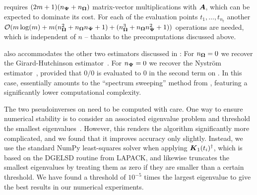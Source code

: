  requires $(2m + 1)(n_{\boldsymbol{\Psi}} + n_{\boldsymbol{\Omega}})$ matrix-vector multiplications with $\boldsymbol{A}$, which can be expected to dominate its cost. For each of the evaluation points $t_1, \dots, t_{n_t}$ another $\mathcal{O}(m \log(m) + m (n_{\boldsymbol{\Omega}}^2 + n_{\boldsymbol{\Omega}} n_{\boldsymbol{\Psi}} + 1) + (n_{\boldsymbol{\Omega}}^3 + n_{\boldsymbol{\Omega}} n_{\boldsymbol{\Psi}}^2 + 1))$ operations are needed, which is independent of $n$ -- thanks to the precomputations discussed above.

 also accommodates the other two estimators discussed in : For $n_{\boldsymbol{\Omega}} = 0$ we recover the Girard-Hutchinson estimator~. For $n_{\boldsymbol{\Psi}} = 0$ we recover the Nyström estimator~, provided that $0/0$ is evaluated to $0$ in the second term on . In this case,  essentially amounts to the \enquote{spectrum sweeping} method from \cite[Algorithm 5]{lin-2017-randomized-estimation}, featuring a significantly lower computational complexity.




The two pseudoinverses on  need to be computed with care. One way to ensure numerical stability is to 
consider an associated eigenvalue problem and threshold the smallest eigenvalues~\cite{lin-2017-randomized-estimation, epperly-2022-theory-quantum}. However, this renders the algorithm significantly more complicated, and we found that it improves accuracy only slightly. Instead, we use the standard NumPy least-squares solver when applying $\boldsymbol{K}_1(t_i)^{\dagger}$, which is based on the DGELSD routine from LAPACK, and likewise truncates the smallest eigenvalues by treating them as zero if they are smaller than a certain threshold. We have found a threshold of $10^{-5}$ times the largest eigenvalue to give the best results in our numerical experiments. 


